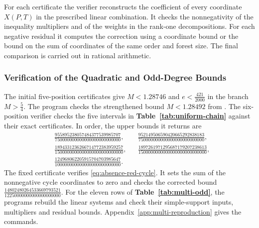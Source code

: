 For each certificate the verifier reconstructs the coefficient
of every coordinate $X(P,T)$ in the prescribed linear combination.
It checks the nonnegativity of the inequality multipliers and of
the weights in the rank-one decompositions. For each negative
residual it computes the correction using a coordinate bound or
the bound on the sum of coordinates of the same order and forest
size. The final comparison is carried out in rational arithmetic.

\subsubsection{Verification of the Quadratic and Odd-Degree Bounds}\label{app:weighted-final-checks}

The initial five-position certificates give $M<1.28746$ and
$e<\frac{421}{2000}$ in the branch $M>\frac54$.
The program checks the strengthened bound $M<1.28492$ from
. The six-position verifier
 checks the five intervals in
\textbf{Table~\ref{tab:uniform-chain}} against their exact
certificates. In order, the upper bounds it returns are
\[
\begin{aligned}
 &\frac{955895238057484377539985707}{750000000000000000000000000},
 &&\frac{952149506590420665292838183}{750000000000000000000000000},\\
 &\frac{1894331236266714772383959257}{1500000000000000000000000000},
 &&\frac{1897261971295687179207238613}{1500000000000000000000000000},\\
 &\frac{124968062205915704703985647}{100000000000000000000000000}.
\end{aligned}
\]
The fixed certificate  verifies
\eqref{eq:absence-red-cycle}. It sets the sum of the nonnegative
cycle coordinates to zero and checks the corrected bound
$\frac{14802480264533669793521}{12250000000000000000000}$.
For the eleven rows of \textbf{Table~\ref{tab:multi-odd}}, the programs
rebuild the linear systems and check their simple-support inputs,
multipliers and residual bounds. Appendix~\ref{app:multi-reproduction}
gives the commands.
